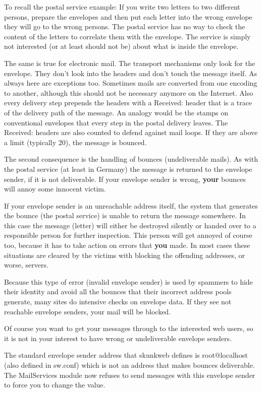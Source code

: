\documentclass{article}
\begin{document}
To recall the postal service example: If you write two letters to two
different persons, prepare the envelopes and then put each letter into the
wrong envelope they will go to the wrong persons. The postal service has
no way to check the content of the letters to correlate them with the
envelope. The service is simply not interested (or at least should not
be) about what is inside the envelope.

The same is true for electronic mail. The transport mechanisms only look
for the envelope. They don't look into the headers and don't touch the
message itself. As always here are exceptions too. Sometimes mails are
converted from one encoding to another, although this should not be necessary
anymore on the Internet. Also every delivery step prepends the headers
with a Received: header that is a trace of the delivery path of the
message. An analogy would be the stamps on conventional envelopes that every
step in the postal delivery leaves. The Received: headers are also counted to
defend against mail loops. If they are above a limit (typically 20), the
message is bounced.

The second consequence is the handling of bounces (undeliverable mails).
As with the postal service (at least in Germany) the message is returned
to the envelope sender, if it is not deliverable. If your envelope sender
is wrong, \textbf{your} bounces will annoy some innocent victim.

If your envelope sender is an unreachable address itself, the system
that generates the bounce (the postal service)
is unable to return the message somewhere. In this case the message
(letter) will either be destroyed silently or handed over to a responsible
person for further inspection. This person will get annoyed of course too,
because it has to take action on errors that \textbf{you} made. In most cases
these situations are cleared by the victims with blocking the offending
addresses, or worse, servers.

Because this type of error (invalid envelope sender) is used by spammers to
hide their identity and avoid all the bounces that their incorrect address
pools generate, many sites do intensive checks on envelope data. If they see
not reachable envelope senders, your mail will be blocked.

Of course you want to get your messages through to the interested web users,
so it is not in your interest to have wrong or undeliverable envelope
senders.

The standard envelope sender address that skunkweb defines is
root@localhost (also defined in sw.conf) which is not an address that
makes bounces deliverable. The MailServices module
now refuses to send messages with this envelope sender to force
you to change the value.
\end{document}
